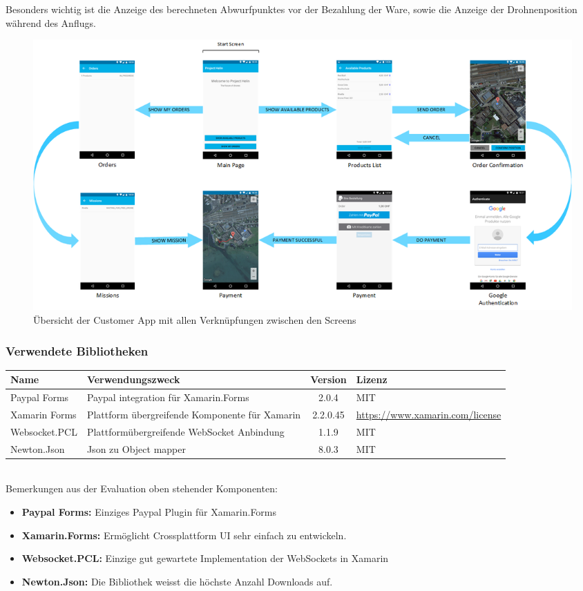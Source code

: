 Besonders wichtig ist die Anzeige des berechneten Abwurfpunktes vor der Bezahlung der Ware, sowie die Anzeige der Drohnenposition während des Anflugs.  

\begin{landscape}
	\begin{figure}[h]
		\centering
		\includegraphics[width=0.8\paperheight] {images/customer-app-pages.png}
		\caption{Übersicht der Customer App mit allen Verknüpfungen zwischen den Screens}
		\label{fig:customer-app-flow}
	\end{figure}
\end{landscape}

\subsubsection{Verwendete Bibliotheken}
\begin{tabularx}{\textwidth}{|X|X|c|X|}
	\hline
	\textbf{Name} & \textbf{Verwendungszweck} & \textbf{Version} & \textbf{Lizenz} \\
	\hline \hline
	Paypal Forms & Paypal integration für Xamarin.Forms & 2.0.4 & MIT \\
	\hline 
	Xamarin Forms & Plattform übergreifende Komponente für Xamarin & 2.2.0.45 & \url{https://www.xamarin.com/license} \\
	\hline 
	Websocket.PCL & Plattformübergreifende WebSocket Anbindung & 1.1.9 & MIT \\
	\hline 
	Newton.Json & Json zu Object mapper & 8.0.3 & MIT \\
	\hline 
\end{tabularx}\\

Bemerkungen aus der Evaluation oben stehender Komponenten:
\begin{itemize}
	\item{\textbf{Paypal Forms:} Einziges Paypal Plugin für Xamarin.Forms}
	\item{\textbf{Xamarin.Forms:} Ermöglicht Crossplattform UI sehr einfach zu entwickeln.}
	\item{\textbf{Websocket.PCL:} Einzige gut gewartete Implementation der WebSockets in Xamarin}
	\item{\textbf{Newton.Json:} Die Bibliothek weisst die höchste Anzahl Downloads auf.}
\end{itemize}

